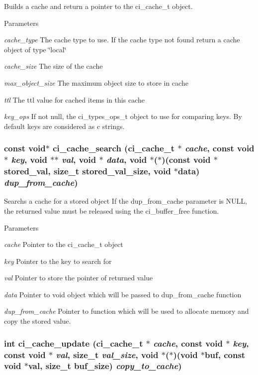 Builds a cache and return a pointer to the ci\_\-cache\_\-t object. 
\begin{DoxyParams}{Parameters}
\item[{\em cache\_\-type}]The cache type to use. If the cache type not found return a cache object of type \char`\"{}local\char`\"{} \item[{\em cache\_\-size}]The size of the cache \item[{\em max\_\-object\_\-size}]The maximum object size to store in cache \item[{\em ttl}]The ttl value for cached items in this cache \item[{\em key\_\-ops}]If not null, the ci\_\-types\_\-ops\_\-t object to use for comparing keys. By default keys are considered as c strings. \end{DoxyParams}
\hypertarget{group__CACHE_gaf9206185729dcf6b3df57d49fea7262d}{
\subsubsection[{ci\_\-cache\_\-search}]{\setlength{\rightskip}{0pt plus 5cm}const void$\ast$ ci\_\-cache\_\-search ({\bf ci\_\-cache\_\-t} $\ast$ {\em cache}, \/  const void $\ast$ {\em key}, \/  void $\ast$$\ast$ {\em val}, \/  void $\ast$ {\em data}, \/  void $\ast$($\ast$)(const void $\ast$stored\_\-val, size\_\-t stored\_\-val\_\-size, void $\ast$data) {\em dup\_\-from\_\-cache})}}
\label{group__CACHE_gaf9206185729dcf6b3df57d49fea7262d}


Searchs a cache for a stored object If the dup\_\-from\_\-cache parameter is NULL, the returned value must be released using the ci\_\-buffer\_\-free function. 
\begin{DoxyParams}{Parameters}
\item[{\em cache}]Pointer to the ci\_\-cache\_\-t object \item[{\em key}]Pointer to the key to search for \item[{\em val}]Pointer to store the pointer of returned value \item[{\em data}]Pointer to void object which will be passed to dup\_\-from\_\-cache function \item[{\em dup\_\-from\_\-cache}]Pointer to function which will be used to allocate memory and copy the stored value. \end{DoxyParams}
\hypertarget{group__CACHE_ga5444f3840260228614820cbd2ed11dc3}{
\subsubsection[{ci\_\-cache\_\-update}]{\setlength{\rightskip}{0pt plus 5cm}int ci\_\-cache\_\-update ({\bf ci\_\-cache\_\-t} $\ast$ {\em cache}, \/  const void $\ast$ {\em key}, \/  const void $\ast$ {\em val}, \/  size\_\-t {\em val\_\-size}, \/  void $\ast$($\ast$)(void $\ast$buf, const void $\ast$val, size\_\-t buf\_\-size) {\em copy\_\-to\_\-cache})}}
\label{group__CACHE_ga5444f3840260228614820cbd2ed11dc3}


